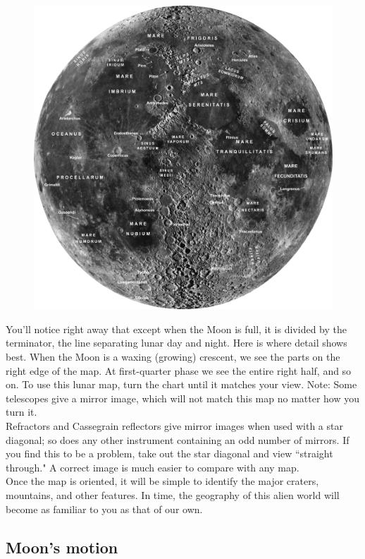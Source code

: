 \documentclass[a4paper,12pt]{extarticle}
\begin{document}
\begin{figure}[H]
	\centering
	\includegraphics[width=0.9\linewidth]{moon1.png}
\end{figure}
You'll notice right away that except when the Moon is full, it is divided by the terminator, the line separating lunar day and night. Here is where detail shows best. When the Moon is a waxing (growing) crescent, we see the parts on the right edge of the map. At first-quarter phase we see the entire right half, and so on. To use this lunar map, turn the chart until it matches your view. Note: Some telescopes give a mirror image, which will not match this map no matter how you turn it.\\

Refractors and Cassegrain reflectors give mirror images when used with a star diagonal; so does any other instrument containing an odd number of mirrors. If you find this to be a problem, take out the star diagonal and view ``straight through." A correct image is much easier to compare with any map.\\

Once the map is oriented, it will be simple to identify the major craters, mountains, and other features. In time, the geography of this alien world will become as familiar to you as that of our own.

\subsection{Moon's motion}
\end{document}
